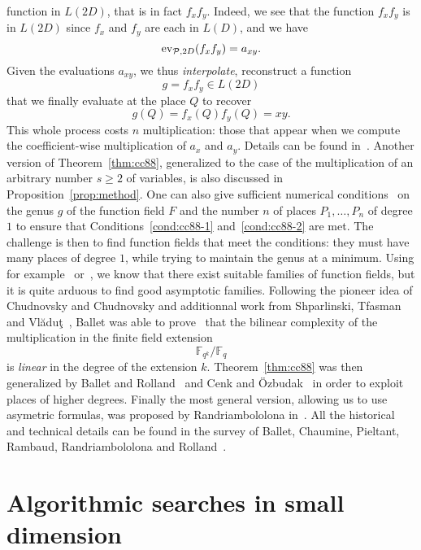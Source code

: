 function in $L(2D)$, that is in fact $f_xf_y$. Indeed, we see that the function
$f_xf_y$ is in $L(2D)$ since $f_x$ and $f_y$ are each in $L(D)$, and we have
\[
  \operatorname{ev}_{\mathcal{P}, 2D}(f_xf_y) = a_{xy}.
\]
Given the evaluations $a_{xy}$, we thus \emph{interpolate}, \ie reconstruct a
function
\[
  g = f_xf_y\in L(2D)
\]
that we finally evaluate at the place $Q$ to recover
\[
  g(Q) = f_x(Q)f_y(Q) = xy.
\]
This whole process costs $n$ multiplication: those that appear when we compute
the coefficient-wise multiplication of $a_x$ and $a_y$.
Details can be found in~\cite{CC88}. Another version of Theorem~\ref{thm:cc88},
generalized to the case of the multiplication of an arbitrary number $s\geq2$ of
variables, is also discussed in Proposition~\ref{prop:method}. One can also give
sufficient numerical conditions~\cite{Ballet98, Ballet99} on the genus $g$ of
the function field $F$ and the number
$n$ of places $P_1, \dots, P_n$ of degree $1$ to ensure that
Conditions~\ref{cond:cc88-1} and~\ref{cond:cc88-2} are met.
The challenge is
then to find function fields that meet the conditions: they must have many
places of degree $1$, while trying to maintain the genus at a minimum.
Using for example~\cite{STV92} or~\cite{Pieltant12}, we know that there exist
suitable families of function fields, but it is quite arduous to find good
asymptotic families. Following the pioneer idea of Chudnovsky and Chudnovsky and
additionnal work from Shparlinski, Tfasman and
Vlăduţ~\cite{STV92}, Ballet was able to prove~\cite{Ballet99} that the bilinear
complexity of the multiplication in the finite field extension
\[
  \mathbb{F}_{q^k}/\mathbb{F}_q
\]
is \emph{linear} in the degree of the extension $k$. Theorem~\ref{thm:cc88} was
then generalized by Ballet and Rolland~\cite{BR04} and Cenk and
Özbudak~\cite{CO10} in order to exploit places of higher degrees.
Finally the most general version, allowing us to use asymetric
formulas, was proposed by Randriambololona in~\cite{Randriam12}.
All the historical and technical details can be found in the survey of Ballet,
Chaumine, Pieltant, Rambaud, Randriambololona and Rolland~\cite{BCPRRR19}.

\section{Algorithmic searches in small dimension}
\label{sec:algorithmic-searches}

%


